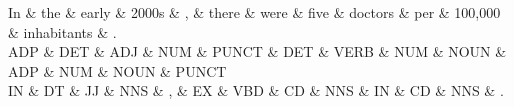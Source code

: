 
\begin{dependency}
\begin{deptext}
In \& the \& early \& 2000s \& , \& there \& were \& five \& doctors \& per \& 100,000 \& inhabitants \& . \\
ADP \& DET \& ADJ \& NUM \& PUNCT \& DET \& VERB \& NUM \& NOUN \& ADP \& NUM \& NOUN \& PUNCT \\
IN \& DT \& JJ \& NNS \& , \& EX \& VBD \& CD \& NNS \& IN \& CD \& NNS \& . \\
\end{deptext}



\end{dependency}
